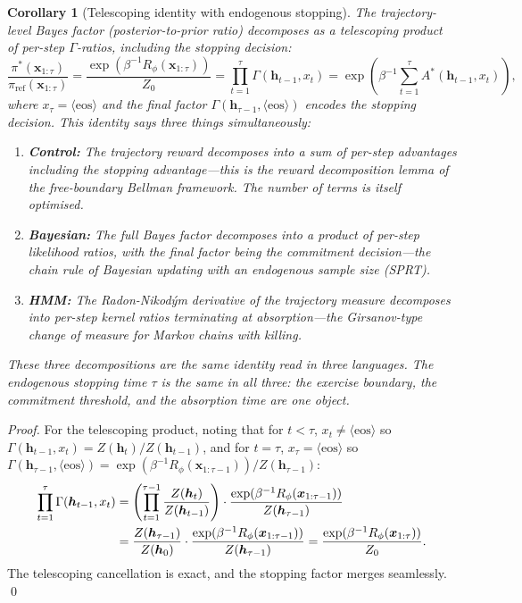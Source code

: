 \documentclass[11pt,a4paper]{article}
\theoremstyle{plain}
\newtheorem{corollary}[theorem]{Corollary}
\theoremstyle{definition}
\theoremstyle{remark}
\begin{document}
\begin{corollary}[Telescoping identity with endogenous stopping]\label{cor:telescope}
The trajectory-level Bayes factor (posterior-to-prior ratio) decomposes as a
telescoping product of per-step $\Gamma$-ratios, including the stopping
decision:
\begin{equation}\label{eq:telescope}
  \frac{\pi^*(\bm{x}_{1:\tau})}{\pi_{\mathrm{ref}}(\bm{x}_{1:\tau})}
  = \frac{\exp(\beta^{-1} R_\phi(\bm{x}_{1:\tau}))}{Z_0}
  = \prod_{t=1}^{\tau} \Gamma(\bm{h}_{t-1}, x_t)
  = \exp\!\left(\beta^{-1} \sum_{t=1}^{\tau} A^*(\bm{h}_{t-1}, x_t)\right),
\end{equation}
where $x_\tau = \langle\mathrm{eos}\rangle$ and the final factor
$\Gamma(\bm{h}_{\tau-1}, \langle\mathrm{eos}\rangle)$ encodes the
stopping decision.
This identity says three things simultaneously:
\begin{enumerate}[label=(\alph*),nosep]
  \item \textbf{Control:} The trajectory reward decomposes into a sum of
        per-step advantages \emph{including the stopping advantage}---this
        is the reward decomposition lemma of the free-boundary Bellman
        framework. The number of terms is itself optimised.
  \item \textbf{Bayesian:} The full Bayes factor decomposes into a product of
        per-step likelihood ratios, with the final factor being the
        \emph{commitment decision}---the chain rule of Bayesian
        updating with an endogenous sample size (SPRT).
  \item \textbf{HMM:} The Radon-Nikod\'ym derivative of the trajectory
        measure decomposes into per-step kernel ratios terminating at
        absorption---the Girsanov-type change of measure for Markov
        chains with killing.
\end{enumerate}
These three decompositions are the same identity read in three languages.
The endogenous stopping time $\tau$ is the same in all three: the
exercise boundary, the commitment threshold, and the absorption time
are one object.
\end{corollary}

\begin{proof}
For the telescoping product, noting that for
$t < \tau$, $x_t \neq \langle\mathrm{eos}\rangle$ so
$\Gamma(\bm{h}_{t-1}, x_t) = Z(\bm{h}_t)/Z(\bm{h}_{t-1})$, and for
$t = \tau$, $x_\tau = \langle\mathrm{eos}\rangle$ so
$\Gamma(\bm{h}_{\tau-1}, \langle\mathrm{eos}\rangle)
= \exp(\beta^{-1} R_\phi(\bm{x}_{1:\tau-1}))/Z(\bm{h}_{\tau-1})$:
\begin{align}
  \prod_{t=1}^{\tau} \Gamma(\bm{h}_{t-1}, x_t)
  &= \left(\prod_{t=1}^{\tau-1} \frac{Z(\bm{h}_t)}{Z(\bm{h}_{t-1})}\right)
     \cdot \frac{\exp(\beta^{-1} R_\phi(\bm{x}_{1:\tau-1}))}{Z(\bm{h}_{\tau-1})} \notag \\
  &= \frac{Z(\bm{h}_{\tau-1})}{Z(\bm{h}_0)}
     \cdot \frac{\exp(\beta^{-1} R_\phi(\bm{x}_{1:\tau-1}))}{Z(\bm{h}_{\tau-1})}
  = \frac{\exp(\beta^{-1} R_\phi(\bm{x}_{1:\tau}))}{Z_0}.
\end{align}
The telescoping cancellation is exact, and the stopping factor merges
seamlessly. \qed
\end{proof}
\end{document}
